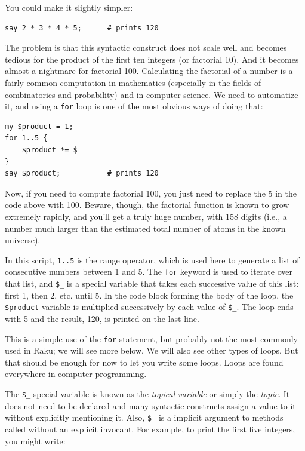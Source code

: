 You could make it slightly simpler:
\begin{verbatim}
say 2 * 3 * 4 * 5;      # prints 120
\end{verbatim}
%

The problem is that this syntactic construct does 
not scale well and becomes tedious for the product of the first 
ten integers (or factorial 10). And it becomes almost a 
nightmare for factorial 100. 
Calculating the factorial of a number is a fairly common computation 
in mathematics (especially in the fields of combinatorics 
and probability) and in computer science. We need to 
automatize it, and using a {\tt for} 
loop is one of the most obvious ways of doing that:

\begin{verbatim}
my $product = 1;
for 1..5 {
    $product *= $_
}
say $product;           # prints 120
\end{verbatim}

Now, if you need to compute factorial 100, you just need to 
replace the 5 in the code above with 100. Beware, though, 
the factorial function is known to grow extremely rapidly, 
and you'll get a truly huge number, with 158 digits 
(i.e., a number much larger than the estimated total 
number of atoms in the known universe).

In this script, {\tt 1..5} is the range operator, which is used here 
to generate a list of consecutive numbers between 1 and 5. The 
{\tt for} keyword is used to iterate over that list, and  
\verb"$_" is a special variable that takes each successive 
value of this list: first 1, then 2, etc. until 5. In the code 
block forming the body of the loop, the {\tt \$product} variable 
is multiplied successively by each value of \verb"$_". The loop 
ends with 5 and the result, 120, is printed on the last line.

This is a simple use of the {\tt for} statement, 
but probably not the most commonly used in Raku; 
we will see more below. We will also see other types of loops. 
But that should be enough for now to let you write some loops. Loops 
are found everywhere in computer programming.

The \verb"$_" special variable is known as the \emph{topical 
variable} or simply the \emph{topic}. It does not need to be declared 
and many syntactic constructs assign a value to it without 
explicitly mentioning it. Also, \verb"$_" is a implicit argument 
to methods called without an explicit invocant. For example, 
to print the first five integers, you might write:

